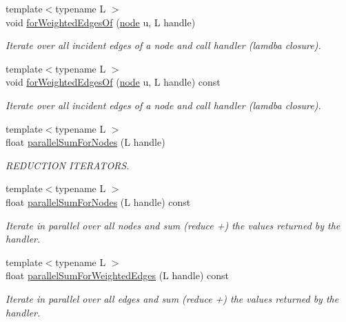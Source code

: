 \begin{DoxyCompactItemize}
{\footnotesize template$<$typename L $>$ }\\void \hyperlink{class_networ_kit_1_1_graph_a8ae088eb738bd7d985196a62f3e3b8a1}{for\-Weighted\-Edges\-Of} (\hyperlink{namespace_networ_kit_a61914158fd771265be48de9942369160}{node} u, L handle)
\begin{DoxyCompactList}\small\item\em Iterate over all incident edges of a node and call handler (lamdba closure). \end{DoxyCompactList}\item 
{\footnotesize template$<$typename L $>$ }\\void \hyperlink{class_networ_kit_1_1_graph_a7def131befb3c0fc285f4774b5c9d634}{for\-Weighted\-Edges\-Of} (\hyperlink{namespace_networ_kit_a61914158fd771265be48de9942369160}{node} u, L handle) const 
\begin{DoxyCompactList}\small\item\em Iterate over all incident edges of a node and call handler (lamdba closure). \end{DoxyCompactList}\item 
{\footnotesize template$<$typename L $>$ }\\float \hyperlink{class_networ_kit_1_1_graph_ae5ac84a0a10e142fd93217f435eb574d}{parallel\-Sum\-For\-Nodes} (L handle)
\begin{DoxyCompactList}\small\item\em R\-E\-D\-U\-C\-T\-I\-O\-N I\-T\-E\-R\-A\-T\-O\-R\-S. \end{DoxyCompactList}\item 
{\footnotesize template$<$typename L $>$ }\\float \hyperlink{class_networ_kit_1_1_graph_ae9c20cc5e11189b892bb264a1d2f779f}{parallel\-Sum\-For\-Nodes} (L handle) const 
\begin{DoxyCompactList}\small\item\em Iterate in parallel over all nodes and sum (reduce +) the values returned by the handler. \end{DoxyCompactList}\item 
{\footnotesize template$<$typename L $>$ }\\float \hyperlink{class_networ_kit_1_1_graph_ae621cf042fa8d136ea4353c1044acd9e}{parallel\-Sum\-For\-Weighted\-Edges} (L handle) const 
\begin{DoxyCompactList}\small\item\em Iterate in parallel over all edges and sum (reduce +) the values returned by the handler. \end{DoxyCompactList}\end{DoxyCompactItemize}
